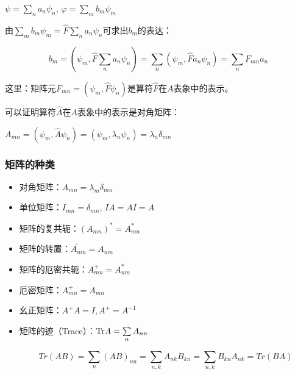 $\psi  = \sum\limits_n {a_n \psi _n } $, $\varphi  = \sum\limits_m {b_m \psi _m } $

由$\sum\limits_m {b_m \psi _m }  = \widehat F\sum\limits_n {a_n \psi _n } $可求出$b_m$的表达： 

\begin{equation}\label{19-4}
b_m = \left( {\psi _m ,\widehat F\sum\limits_n {a_n \psi _n } } \right) = \sum\limits_n {\left( {\psi _m ,\widehat F a_n \psi _n } \right)}   = \sum\limits_n {F_{mn} a_n }
\end{equation}

这里：矩阵元$F_{mn}  = \left( {\psi _m ,\widehat F\psi _n } \right)$是算符$\hat F$在$A$表象中的表示。

可以证明算符$\hat A$在$A$表象中的表示是对角矩阵：

$A_{mn} = \left( {\psi _m ,\widehat A\psi _n } \right) = \left(
{\psi _m ,\lambda _n \psi _n } \right) = \lambda _n \delta _{mn} $




\subsubsection{矩阵的种类}

\begin{itemize}
    \item 对角矩阵：$A_{mn}  = \lambda _m \delta _{mn} $


    \item 单位矩阵：$I_{mn}  = \delta _{mn} $, $IA = AI = A$

    \item 矩阵的复共轭：$\left( {A_{mn} } \right)^*  = A_{mn}^* $


    \item 矩阵的转置：$\widetilde{A_{mn} } = A_{nm} $


    \item 矩阵的厄密共轭：$A_{mn}^ +   = A_{nm}^* $


    \item 厄密矩阵：$A_{mn}^ +   = A_{mn} $

    \item 幺正矩阵：$A^ +  A = I,A^ +   = A^{ - 1} $


    \item 矩阵的迹（Trace）：${\rm{Tr}}A = \sum\limits_n {A_{nn} } $


\begin{equation}\label{19-5}
Tr (AB) = \sum\limits_n {\left( {AB} \right)_{nn} }  = \sum\limits_{n,k} {A_{nk} B_{kn} }  = \sum\limits_{n,k} {B_{kn} A_{nk} }  = Tr(BA)
\end{equation}

   \end{itemize}


